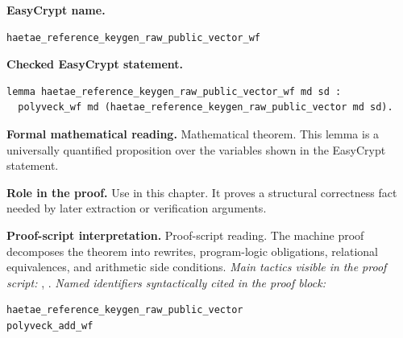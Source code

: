 \begin{formaltheorem}
\noindent\textbf{EasyCrypt name.}
\begin{lstlisting}[language=EasyCrypt,basicstyle=\ttfamily\scriptsize]
haetae_reference_keygen_raw_public_vector_wf
\end{lstlisting}
\noindent\textbf{Checked EasyCrypt statement.}
\begin{lstlisting}[language=EasyCrypt,basicstyle=\ttfamily\scriptsize]
lemma haetae_reference_keygen_raw_public_vector_wf md sd :
  polyveck_wf md (haetae_reference_keygen_raw_public_vector md sd).
\end{lstlisting}
\noindent\textbf{Formal mathematical reading.}
Mathematical theorem. This lemma is a universally quantified proposition over the variables shown in the EasyCrypt statement.

\noindent\textbf{Role in the proof.}
Use in this chapter. It proves a structural correctness fact needed by later extraction or verification arguments.

\noindent\textbf{Proof-script interpretation.}
Proof-script reading. The machine proof decomposes the theorem into rewrites, program-logic obligations, relational equivalences, and arithmetic side conditions.
\emph{Main tactics visible in the proof script:} , .
\emph{Named identifiers syntactically cited in the proof block:}
\begin{lstlisting}[language=EasyCrypt,basicstyle=\ttfamily\scriptsize]
haetae_reference_keygen_raw_public_vector
polyveck_add_wf
\end{lstlisting}

\end{formaltheorem}

